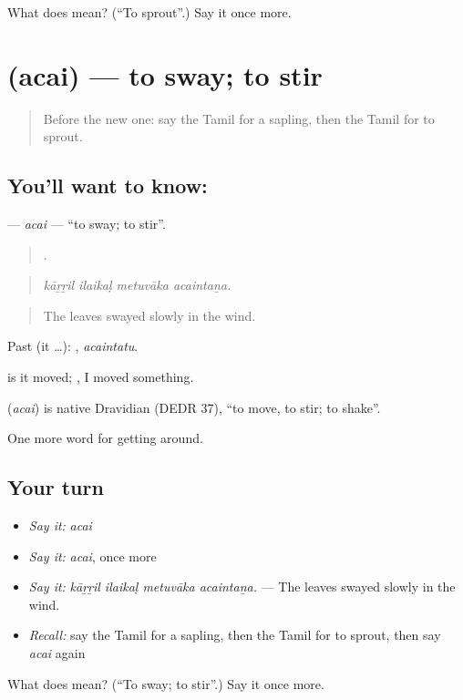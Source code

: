 \begin{tcolorbox}[breakable,colback=teal!4,colframe=teal!35!black,title={Before you move on}]
What does  mean? (\textquotedblleft{}To sprout\textquotedblright{}.) Say it once more.
\end{tcolorbox}
\section[\texorpdfstring{\ta{அசை} (acai)}{அசை (acai)}]{ (acai) — to sway; to stir}

\label{lesson:TA-C439-acai}



\begin{quote}
Before the new one: say the Tamil for a sapling, then the Tamil for to sprout.
\end{quote}

\subsection*{You'll want to know: }
\textbf{} — \emph{acai} — \textquotedblleft{}to sway; to stir\textquotedblright{}.

\begin{quote}
   .
\end{quote}

\begin{quote}
\emph{kāṟṟil ilaikaḷ metuvāka acaintaṉa.}
\end{quote}

\begin{quote}
The leaves swayed slowly in the wind.
\end{quote}

Past (it …): , \emph{acaintatu}.

 is it moved; , I moved something.

\begin{cousinweb}
\textbf{} (\emph{acai}) is native Dravidian (DEDR 37), \textquotedblleft{}to move, to stir; to shake\textquotedblright{}.
\end{cousinweb}

\begin{grammarlens}[title={What you've built}]
One more word for getting around.
\end{grammarlens}

\subsection*{Your turn}
\begin{itemize}
\raggedright
  \item \emph{Say it:} \emph{acai}
  \item \emph{Say it:} \emph{acai}, once more
  \item \emph{Say it:} \emph{kāṟṟil ilaikaḷ metuvāka acaintaṉa.} — The leaves swayed slowly in the wind.
  \item \emph{Recall:} say the Tamil for a sapling, then the Tamil for to sprout, then say \emph{acai} again
\end{itemize}

\begin{tcolorbox}[breakable,colback=teal!4,colframe=teal!35!black,title={Before you move on}]
What does  mean? (\textquotedblleft{}To sway; to stir\textquotedblright{}.) Say it once more.
\end{tcolorbox}
